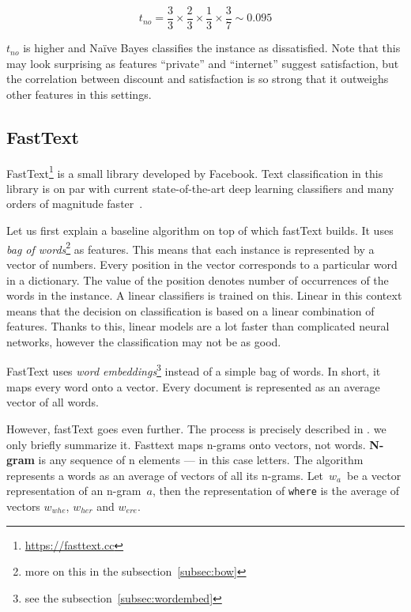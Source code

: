 \begin{equation}
	t_{no} = 
	\frac{3}{3} \times
	\frac{2}{3} \times
	\frac{1}{3} \times
	\frac{3}{7}
	\sim 0.095
\end{equation}

$t_{no}$ is higher and Na\"{i}ve Bayes classifies the instance as dissatisfied.
Note that this may look surprising as features ``private'' and ``internet'' suggest satisfaction,
but the correlation between discount and satisfaction is so strong that it outweighs other features in this settings.

\subsection{FastText}

FastText\footnote{\url{https://fasttext.cc}} is a small library developed by Facebook.
Text classification in this library is on par with current state-of-the-art deep learning classifiers
and many orders of magnitude faster~\citep{Joulin2017bag}.

Let us first explain a baseline algorithm on top of which fastText builds.
It uses {\it bag of words}\footnote{more on this in the subsection~\ref{subsec:bow}} as features.
This means that each instance is represented by a vector of numbers.
Every position in the vector corresponds to a particular word in a dictionary.
The value of the position denotes number of occurrences of the words in the instance.
A linear classifiers is trained on this.
Linear in this context means that the decision on classification is based on a linear combination of features.
Thanks to this, linear models are a lot faster than complicated neural networks, however the classification may not be as good.

FastText uses {\it word embeddings}\footnote{see the subsection~\ref{subsec:wordembed}} instead of a simple bag of words.
In short, it maps every word onto a vector. Every document is represented as an average vector of all words.

However, fastText goes even further.
The process is precisely described in \citet{Bojanowski2017enriching}.
we only briefly summarize it.
Fasttext maps n-grams onto vectors, not words.
{\bf N-gram} is any sequence of n elements --- in this case letters.
The algorithm represents a words as an average of vectors of all its n-grams.
Let~$w_{a}$~be a vector representation of an n-gram~$a$, then 
the representation of \texttt{where} is the average of vectors
$w_{whe}$, 
$w_{her}$ and
$w_{ere}$.

